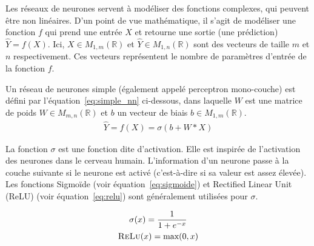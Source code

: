 Les réseaux de neurones servent à modéliser des fonctions complexes, qui peuvent être non linéaires.
%
D'un point de vue mathématique, il s'agit de modéliser une fonction $f$ qui prend une entrée $X$ et retourne une sortie (une prédiction) $\hat{Y} = f(X)$.
%
Ici, $X \in M_{1,m}(\mathds{R})$ et $\hat{Y} \in M_{1,n}(\mathds{R})$ sont des vecteurs de taille $m$ et $n$ respectivement.
%
Ces vecteurs représentent le nombre de paramètres d'entrée de la fonction $f$.
%


Un réseau de neurones simple (également appelé perceptron mono-couche) est défini par l'équation~\ref{eq:simple_nn} ci-dessous, dans laquelle $W$ est une matrice de poids $W \in M_{m, n}(\mathds{R})$ et $b$ un vecteur de biais $b \in M_{1,m}(\mathds{R})$.
%
\begin{align}
    \hat{Y} = f(X) = \sigma (b + W * X) \label{eq:simple_nn}
\end{align}


La fonction $\sigma$ est une fonction dite d'activation.
Elle est inspirée de l'activation des neurones dans le cerveau humain.
L'information d'un neurone passe à la couche suivante si le neurone est activé (c'est-à-dire si sa valeur est assez élevée).
Les fonctions Sigmoïde (voir équation~\ref{eq:sigmoide}) et Rectified Linear Unit (ReLU) (voir équation~\ref{eq:relu}) sont généralement utilisées pour $\sigma$.

\begin{gather}
    \sigma(x) = \frac{1}{1+e^{-x}} \label{eq:sigmoide} \\
    \textsc{ReLu}(x) = \text{max}(0, x) \label{eq:relu}
\end{gather}


